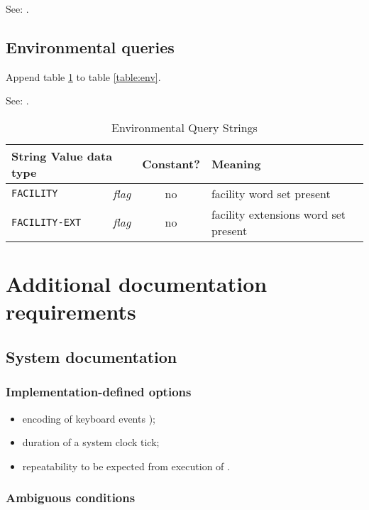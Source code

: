 See: .

\subsection{Environmental queries} %
Append table \ref{facility:env} to table \ref{table:env}.

See: .

\begin{table}[h]
  \begin{center}
	\caption{Environmental Query Strings}
	\label{facility:env}
	\begin{tabular}{p{9em}rcp{}}
		\hline\hline
		\multicolumn{2}{l}{String \hfill Value data type} & Constant? & Meaning \\
		\hline
		\texttt{FACILITY}		& \emph{flag}	& no	&
			facility word set present \\
		\texttt{FACILITY-EXT}	& \emph{flag}	& no	&
			facility extensions word set present \\
		\hline\hline
	\end{tabular}
  \end{center}
\end{table}

\section{Additional documentation requirements} %

\subsection{System documentation} %

\subsubsection{Implementation-defined options} %

\begin{itemize}
\item encoding of keyboard events );
\item duration of a system clock tick;
\item repeatability to be expected from execution of
	.
\end{itemize}

\subsubsection{Ambiguous conditions} %

